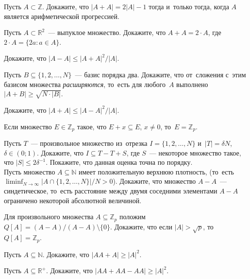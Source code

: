 \begin{problems}

\item
Пусть $A \subset \mathbb{Z}$.
Докажите, что $|A + A| = 2 |A| - 1$ тогда и~только тогда, когда $A$ является
арифметической прогрессией.

\item
Пусть $A \subset \mathbb{R}^2$~--- выпуклое множество.
Докажите, что $A + A = 2 \cdot A$, где $2 \cdot A = \{ 2a \colon a \in A \}$.

\item
Докажите, что $|A - A| \leq |A + A|^2 / |A|$.

\item
Пусть $B \subseteq \{ 1, 2, \ldots, N \}$~--- базис порядка два.
Докажите, что от~сложения с~этим базисом множества \emph{расширяются},
то~есть для любого~$A$ выполнено $|A + B| \geq \sqrt{N \cdot | B |}$.

\item
Докажите, что $|A + A| \leq |A - A|^2 / |A|$.

\item
Если множество $E \in \mathbb{Z}_p$ такое, что $E + x \subseteq E$, $x \neq 0$,
то~$E = \mathbb{Z}_p$.

\item
\subproblem
Пусть $T$~--- произвольное множество из~отрезка $I = \{ 1, 2, \ldots, N \}$
и~$|T| = \delta N$, $\delta \in (0; 1)$.
Докажите, что $I \subseteq T - T + S$, где $S$~--- некоторое множество такое,
что $|S| \leq 2 \delta^{-1}$.
Покажите, что данная оценка точна по порядку.
\\
\subproblem
Пусть множество $A \subseteq \mathbb{N}$ имеет положительную верхнюю плотность,
(то~есть
\(
    \liminf_{N \to \infty}
        \bigl| A \cap \{ 1, 2, \ldots, N \} \bigr| / N
>
    0
\)).
Докажите, что множество $A - A$~--- синдетическое, то~есть расстояние между
двумя соседними элементами $A - A$ ограничено некоторой абсолютной величиной.

\item
Для произвольного множества $A \subseteq \mathbb{Z}_p$ положим
\(
    Q[A] = (A - A) / (A - A) \setminus \{ 0 \}
\).
Докажите, что если $|A| > \sqrt{p}$, то~$Q[A] = \mathbb{Z}_p$.

\item
Пусть $A \subseteq \mathbb{N}$.
Докажите, что $|A A + A| \geq |A|^2$.

\item
Пусть $A \subseteq \mathbb{R}^{+}$.
Докажите, что $|A A + A A - A A| \geq |A|^2$.

\end{problems}


